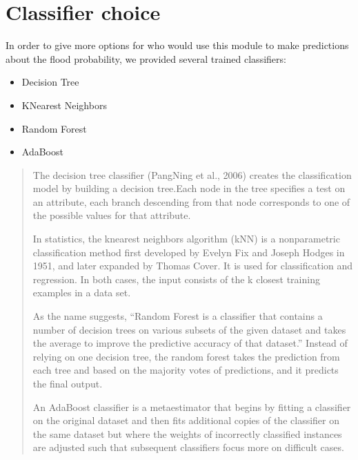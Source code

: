\documentclass[letterpaper,10pt,english]{sphinxmanual}
\begin{document}
\chapter{Classifier choice}
\label{\detokenize{index:classifier-choice}}
\sphinxAtStartPar
In order to give more options for who would use this module to make predictions about the flood probability, we provided several trained classifiers:
\begin{itemize}
\item {} 
\sphinxAtStartPar
Decision Tree

\item {} 
\sphinxAtStartPar
K\sphinxhyphen{}Nearest Neighbors

\item {} 
\sphinxAtStartPar
Random Forest

\item {} 
\sphinxAtStartPar
AdaBoost

\end{itemize}
\begin{quote}\begin{description}
\sphinxAtStartPar
The decision tree classifier (Pang\sphinxhyphen{}Ning et al., 2006) creates the classification model by building a decision tree.Each node in the tree specifies a test on an attribute, each branch descending from that node corresponds to one of the possible values for that attribute.

\sphinxAtStartPar
In statistics, the k\sphinxhyphen{}nearest neighbors algorithm (k\sphinxhyphen{}NN) is a non\sphinxhyphen{}parametric classification method first developed by Evelyn Fix and Joseph Hodges in 1951, and later expanded by Thomas Cover. It is used for classification and regression. In both cases, the input consists of the k closest training examples in a data set.

\sphinxAtStartPar
As the name suggests, “Random Forest is a classifier that contains a number of decision trees on various subsets of the given dataset and takes the average to improve the predictive accuracy of that dataset.” Instead of relying on one decision tree, the random forest takes the prediction from each tree and based on the majority votes of predictions, and it predicts the final output.

\sphinxAtStartPar
An AdaBoost classifier is a meta\sphinxhyphen{}estimator that begins by fitting a classifier on the original dataset and then fits additional copies of the classifier on the same dataset but where the weights of incorrectly classified instances are adjusted such that subsequent classifiers focus more on difficult cases.

\end{description}\end{quote}
\end{document}
